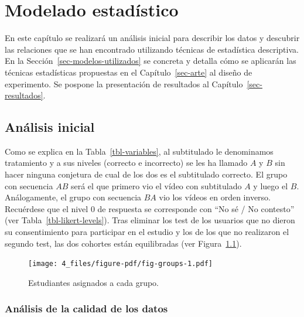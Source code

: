 \documentclass[
  12pt,
  a4paper,
  extrafontsizes,
  onecolumn,
  openright,
  table]{memoir}
\begin{document}
\hypertarget{sec-modelado}{%
\chapter{Modelado estadístico}\label{sec-modelado}}

En este capítulo se realizará un análisis inicial para describir los
datos y descubrir las relaciones que se han encontrado utilizando
técnicas de estadística descriptiva. En la
Sección~\ref{sec-modelos-utilizados} se concreta y detalla cómo se
aplicarán las técnicas estadísticas propuestas en el
Capítulo~\ref{sec-arte} al diseño de experimento. Se pospone la
presentación de resultados al Capítulo~\ref{sec-resultados}.

\hypertarget{sec-eda}{%
\section{Análisis inicial}\label{sec-eda}}

Como se explica en la Tabla~\ref{tbl-variables}, al subtitulado le
denominamos tratamiento y a sus niveles (correcto e incorrecto) se les
ha llamado \(A\) y \(B\) sin hacer ninguna conjetura de cual de los dos
es el subtitulado correcto. El grupo con secuencia \(AB\) será el que
primero vio el vídeo con subtitulado \(A\) y luego el \(B\).
Análogamente, el grupo con secuencia \(BA\) vio los vídeos en orden
inverso. Recuérdese que el nivel 0 de respuesta se corresponde con
\enquote{No sé / No contesto} (ver Tabla~\ref{tbl-likert-levels}). Tras
eliminar los test de los usuarios que no dieron su consentimiento para
participar en el estudio y los de los que no realizaron el segundo test,
las dos cohortes están equilibradas (ver Figura~\ref{fig-groups}).

\begin{figure}[h]

{\centering \texttt{[image: 4\_files/figure-pdf/fig-groups-1.pdf]}

}

\caption{\label{fig-groups}Estudiantes asignados a cada grupo.}

\end{figure}

\hypertarget{anuxe1lisis-de-la-calidad-de-los-datos}{%
\subsection{Análisis de la calidad de los
datos}\label{anuxe1lisis-de-la-calidad-de-los-datos}}
\end{document}
